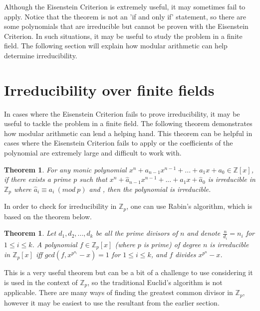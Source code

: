 \documentclass{article}
\newtheorem*{Definition: Sylvester Matrix}{Definition}
\newtheorem*{Definition: Resultant 1}{Definition 1}
\newtheorem*{Definition: Resultant 2}{Definition 2}
\newtheorem*{Theorem: Resultant proves shared roots}{Theorem 1}
\newtheorem*{Theorem: Minimal polynomial for beta}{Theorem 2}
\newtheorem*{Example: Sylvester Matrix Ex}{Example}
\newtheorem*{Theorem: Roots}{Theorem}
\newtheorem*{Corollary: Discriminant}{Corollary}
\newtheorem*{Theorem: Rational Root Theorem}{Theorem}
\newtheorem*{Corollary: Cubic Irreducibility}{Corollary}
\newtheorem*{Theorem: Eisenstein Criterion}{Theorem}
\newtheorem*{Theorem: mod p Test}{Theorem}
\newtheorem*{Theorem: Rabin's algorithm}{Theorem}
\newtheorem*{Theorem: gcd finite field}{Theorem}
\newtheorem*{Theorem: Gauss Irreducibles}{Theorem}
\newtheorem*{Theorem: Number of irreducibles}{Theorem}
\newtheorem*{Example: All irreducibles in Z_2}{Example}
\newtheorem*{Formula: Minimal polynomial for r root of a}{Formula 1}
\newtheorem*{Example: minimal polynomial for sqrt(p)}{Example}
\newtheorem*{Example: Golden Ratio}{Example}
\newtheorem*{Formula: Minimal polynomial for a+b}{Formula 2}
\newtheorem*{Example: 1 + sqrt(3)}{Example}
\newtheorem*{Example: cubic root of unity}{Example}
\newtheorem*{Formula: Minimal polynomial for a/b}{Formula 3}
\newtheorem*{Formula: Minimal polynomial for ab}{Formula 4}
\newtheorem*{Example: cubrt(4)/i+1}{Example}
\newtheorem*{Example: 5zeta}{Example}
\newtheorem*{Example: Wild one}{Example}
\begin{document}
Although the Eisenstein Criterion is extremely useful, it may sometimes fail to apply. Notice that the theorem is not an 'if and only if' statement, so there are some polynomials that are irreducible but cannot be proven with the Eisenstein Criterion. In such situations, it may be useful to study the problem in a finite field. The following section will explain how modular arithmetic can help determine irreducibility. 

\section{Irreducibility over finite fields}

In cases where the Eisenstein Criterion fails to prove irreducibility, it may be useful to tackle the problem in a finite field. The following theorem demonstrates how modular arithmetic can lend a helping hand. This theorem can be helpful in cases where the Eisenstein Criterion fails to apply or the coefficients of the polynomial are extremely large and difficult to work with.

\begin{Theorem: mod p Test}
For any monic polynomial $x^n+a_{n-1}x^{n-1}+...+a_1x+a_0 \in \mathbb{Z}[x]$, if there exists a prime $p$ such that $x^n+\widehat{a}_{n-1}x^{n-1}+...+\widehat{a}_1x+\widehat{a}_0$ is irreducible in $\mathbb{Z}_p$ where $\widehat{a}_i \equiv a_i \ (mod \ p)$ and , then the polynomial is irreducible. 
\end{Theorem: mod p Test}

In order to check for irreducibility in $\mathbb{Z}_p$, one can use Rabin's algorithm, which is based on the theorem below. 

\begin{Theorem: Rabin's algorithm}
Let $d_1,d_2,...,d_k$ be all the prime divisors of $n$ and denote $\frac{n}{d_i}=n_i$ for $1 \leq i \leq k$. A polynomial $f \in \mathbb{Z}_p[x]$ (where $p$ is prime) of degree $n$ is irreducible in $\mathbb{Z}_p[x]$ iff $gcd(f, x^{p^{n_i}} - x) = 1$ for $1 \leq i \leq k$, and $f$ divides $x^{p^{n}}-x$. \cite{Rabin's Irreducibility Test}
\end{Theorem: Rabin's algorithm}

This is a very useful theorem but can be a bit of a challenge to use considering it is used in the context of $\mathbb{Z}_p$, so the traditional Euclid's algorithm is not applicable. There are many ways of finding the greatest common divisor in $\mathbb{Z}_p$, however it may be easiest to use the resultant from the earlier section.
\end{document}
